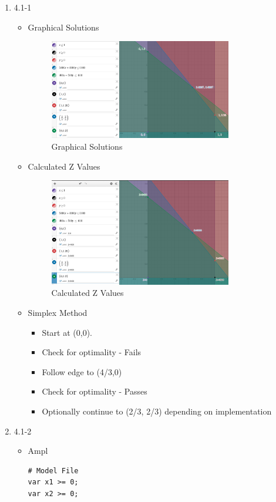 \documentclass[12pt, letter]{article}
\begin{document}
\begin{enumerate}
\item 4.1-1
\begin{itemize}
\item Graphical Solutions
\begin{figure}[h]
	\centering
	\includegraphics[width=0.8\textwidth]{p1a}
	\caption{Graphical Solutions}
	\label{fig:p2}
\end{figure}
\item Calculated Z Values
\begin{figure}[h]
	\centering
	\includegraphics[width=0.8\textwidth]{p1b}
	\caption{Calculated Z Values}
	\label{fig:p2b}
\end{figure}
\item Simplex Method
\begin{itemize}
	\item Start at (0,0).
	\item Check for optimality - Fails
	\item Follow edge to (4/3,0)
	\item Check for optimality - Passes
	\item Optionally continue to (2/3, 2/3) depending on implementation
\end{itemize}
\end{itemize}

\item 4.1-2
\begin{itemize}
\item Ampl
\begin{verbatim}
# Model File
var x1 >= 0;
var x2 >= 0;


\end{verbatim}
\end{itemize}
\end{enumerate}
\end{document}
